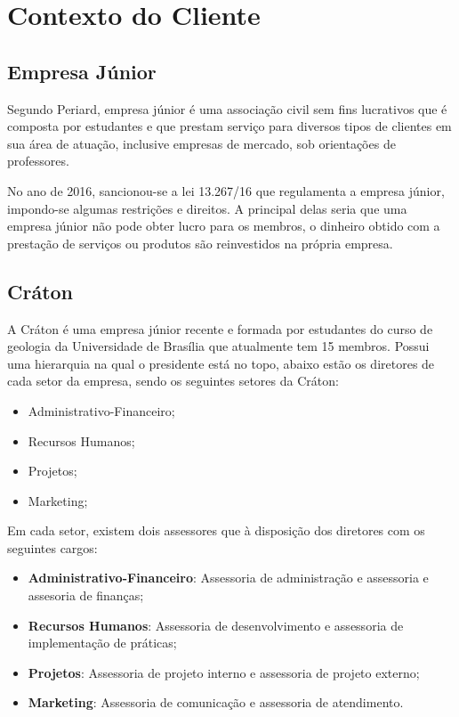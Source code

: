 \chapter{Contexto do Cliente}

\section{Empresa Júnior}

  Segundo Periard, empresa júnior é uma associação civil sem fins lucrativos que é
  composta por estudantes e que prestam serviço para diversos tipos de clientes em sua
  área de atuação, inclusive empresas de mercado, sob orientações de professores.\cite{periardej}

  No ano de 2016, sancionou-se a lei 13.267/16 que regulamenta a empresa júnior, impondo-se
  algumas restrições e direitos. A principal delas seria que uma empresa júnior não pode obter
  lucro para os membros, o dinheiro obtido com a prestação de serviços ou produtos são reinvestidos
  na própria empresa.

\section{Cráton}

  A Cráton é uma empresa júnior recente e formada por estudantes do curso de geologia da
  Universidade de Brasília que atualmente tem 15 membros. Possui uma hierarquia na qual o
  presidente está no topo, abaixo estão os diretores de cada setor da empresa, sendo os
  seguintes setores da Cráton:

  \begin{itemize}
    \item{Administrativo-Financeiro;}
    \item{Recursos Humanos;}
    \item{Projetos;}
    \item{Marketing;}
  \end{itemize}

  Em cada setor, existem dois assessores que à disposição dos diretores com os seguintes cargos:

  \begin{itemize}
    \item \textbf{Administrativo-Financeiro}: Assessoria de administração e assessoria
    e assesoria de finanças;
    \item \textbf{Recursos Humanos}: Assessoria de desenvolvimento e assessoria de implementação
    de práticas;
    \item \textbf{Projetos}: Assessoria de projeto interno e assessoria de projeto externo;
    \item \textbf{Marketing}: Assessoria de comunicação e assessoria de atendimento.
  \end{itemize}

